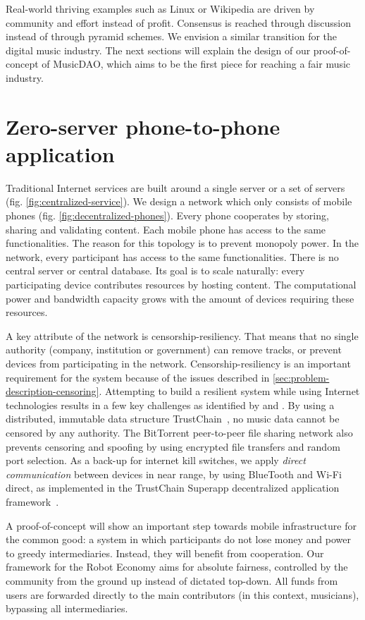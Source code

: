 Real-world thriving examples such as Linux or Wikipedia are driven by community and effort instead of profit. Consensus is reached through discussion instead of through pyramid schemes. We envision a similar transition for the digital music industry. The next sections will explain the design of our proof-of-concept of MusicDAO, which aims to be the first piece for reaching a fair music industry.

\section{Zero-server phone-to-phone application}
Traditional Internet services are built around a single server or a set of servers (fig. \ref{fig:centralized-service}). We design a network which only consists of mobile phones (fig. \ref{fig:decentralized-phones}). Every phone cooperates by storing, sharing and validating content. Each mobile phone has access to the same functionalities. The reason for this topology is to prevent monopoly power. In the network, every participant has access to the same functionalities. There is no central server or central database. Its goal is to scale naturally: every participating device contributes resources by hosting content. The computational power and bandwidth capacity grows with the amount of devices requiring these resources.

A key attribute of the network is censorship-resiliency. That means that no single authority (company, institution or government) can remove tracks, or prevent devices from participating in the network. Censorship-resiliency is an important requirement for the system because of the issues described in \ref{sec:problem-description-censoring}. Attempting to build a resilient system while using Internet technologies results in a few key challenges as identified by \cite{pouwelse2012censorship} and \cite{di2014bypassing}. By using a distributed, immutable data structure TrustChain~\citep{otte2017trustchain}, no music data cannot be censored by any authority. The BitTorrent peer-to-peer file sharing network also prevents censoring and spoofing by using encrypted file transfers and random port selection. As a back-up for internet kill switches, we apply \textit{direct communication} between devices in near range, by using BlueTooth and Wi-Fi direct, as implemented in the TrustChain Superapp decentralized application framework~\citep{mattskala2020}.

A proof-of-concept will show an important step towards mobile infrastructure for the common good: a system in which participants do not lose money and power to greedy intermediaries. Instead, they will benefit from cooperation. Our framework for the Robot Economy aims for absolute fairness, controlled by the community from the ground up instead of dictated top-down. All funds from users are forwarded directly to the main contributors (in this context, musicians), bypassing all intermediaries.

